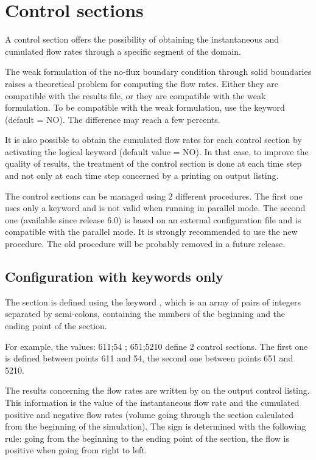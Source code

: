 \section{Control sections}
\label{sec:contr:sect}
A control section offers the possibility of obtaining the instantaneous
and cumulated flow rates through a specific segment of the domain.

The weak formulation of the no-flux boundary condition through solid boundaries
raises a theoretical problem for computing the flow rates.
Either they are compatible with the results file, or they are compatible
with the weak formulation.
To be compatible with the weak formulation, use the keyword
 (default = NO).
The difference may reach a few percents.

It is also possible to obtain the cumulated flow rates for each control section
by activating the logical keyword 
(default value = NO).
In that case, to improve the quality of results, the treatment of the control
section is done at each time step and not only at each time step concerned
by a printing on output listing.

The control sections can be managed using 2 different procedures.
The first one uses only a keyword and is not valid when running in parallel mode.
The second one (available since release 6.0) is based on an external
configuration file and is compatible with the parallel mode.
It is strongly recommended to use the new procedure.
The old procedure will be probably removed in a future release.


\subsection{Configuration with keywords only}

The section is defined using the keyword ,
which is an array of pairs of integers separated by semi-colons,
containing the numbers of the beginning and the ending point of the section.

For example, the values: 611;54 ; 651;5210 define 2 control sections.
The first one is defined between points 611 and 54,
the second one between points 651 and 5210.

The results concerning the flow rates are written by 
on the output control listing.
This information is the value of the instantaneous flow rate
and the cumulated positive and negative flow rates
(volume going through the section calculated from the beginning of the
simulation).
The sign is determined with the following rule:
going from the beginning to the ending point of the section,
the flow is positive when going from right to left.

